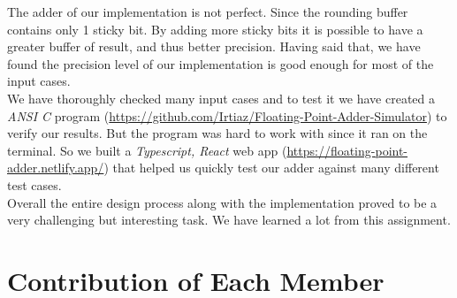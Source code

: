 \documentclass[14pt]{article}
\begin{document}
The adder of our implementation is not perfect. Since the rounding buffer contains only 1 sticky bit. By adding more sticky bits it is possible to have a greater buffer of result, and thus better precision. Having said that, we have found the precision level of our implementation is good enough for most of the input cases.\\

We have thoroughly checked many input cases and to test it we have created a \textit{ANSI C} program (\url{https://github.com/Irtiaz/Floating-Point-Adder-Simulator}) to verify our results. But the program was hard to work with since it ran on the terminal. So we built a \textit{Typescript, React} web app (\url{https://floating-point-adder.netlify.app/}) that helped us quickly test our adder against many different test cases.\\

Overall the entire design process along with the implementation proved to be a very challenging but interesting task. We have learned a lot from this assignment.

\section{Contribution of Each Member}
\end{document}

